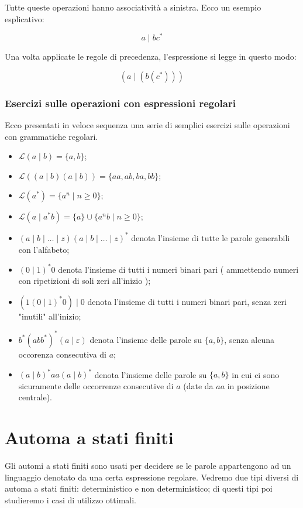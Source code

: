 \documentclass[class=book, crop=false, oneside, 12pt]{standalone}
\begin{document}
\noindent Tutte queste operazioni hanno associatività a sinistra.
Ecco un esempio esplicativo:

\begin{equation*}
    a \mid b c^\ast
\end{equation*}

\noindent Una volta applicate le regole di precedenza, l'espressione si legge in questo modo:

\begin{equation*}
    (a \mid ( b  ( c^\ast ) ) )
\end{equation*}    

\subsubsection{Esercizi sulle operazioni con espressioni regolari}
Ecco presentati in veloce sequenza una serie di semplici esercizi sulle operazioni con grammatiche regolari. 

\begin{itemize}
    \item \(\mathcal{L}(a \mid b) = \{a, b\}\);
    \item \(\mathcal{L}((a \mid b) (a \mid b)) = \{aa, ab, ba, bb\}\);
    \item \(\mathcal{L}(a^*) = \{a^n \mid n \ge 0\}\);
    \item \(\mathcal{L}(a \mid a^\ast b) = \{a\} \cup \{a^n b \mid n \ge 0\}\);
    \item \( (a \mid b \mid \ldots \mid z)(a \mid b \mid \ldots \mid z)^\ast \) denota l’insieme di tutte le parole generabili con l'alfabeto;
    \item \( (0 \mid 1)^\ast 0\) denota l’insieme di tutti i numeri binari pari ( ammettendo numeri con ripetizioni di soli zeri all'inizio );
    \item \( ( 1(0 \mid 1)^\ast 0) \mid 0 \)  denota l’insieme di tutti i numeri binari pari, senza zeri "inutili" all'inizio;
    \item \( b^\ast (abb^\ast )^\ast ( a \mid \varepsilon ) \) denota l’insieme delle parole su \(\{a,b\} \), senza alcuna occorenza consecutiva di \(a\);
    \item \( (a \mid b)^\ast aa(a \mid b)^\ast \) denota l’insieme delle parole su \( \{a,b\} \) in cui ci sono sicuramente delle occorrenze consecutive di \(a\) (date da \(aa\) in posizione centrale).
\end{itemize}

\section{Automa a stati finiti}
Gli automi a stati finiti sono usati per decidere se le parole appartengono ad un linguaggio denotato da una certa espressione regolare.
Vedremo due tipi diversi di automa a stati finiti: deterministico e non deterministico; di questi tipi poi studieremo i casi di utilizzo ottimali.
\end{document}
